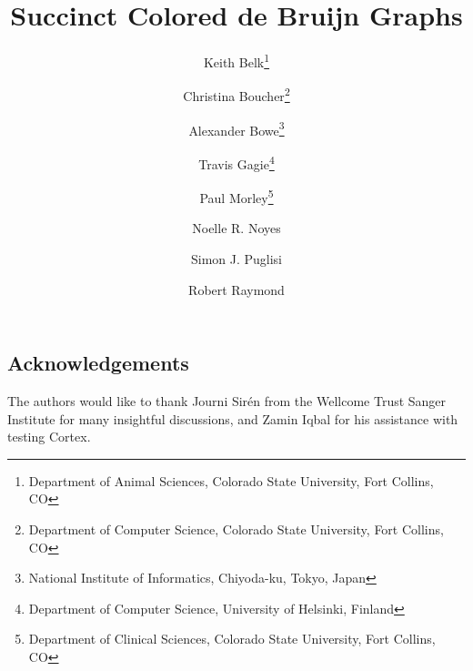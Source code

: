 \documentclass[11pt,letterpaper]{article}
\begin{document}
\title{Succinct Colored de Bruijn Graphs}
\author{Keith Belk\thanks{Department of Animal Sciences, Colorado State University, Fort Collins, CO}
\and Christina Boucher\thanks{Department of Computer Science, Colorado State University, Fort Collins, CO}
\and Alexander Bowe\thanks{National Institute of Informatics, Chiyoda-ku, Tokyo, Japan}
\and Travis Gagie\thanks{Department of Computer Science, University of Helsinki, Finland} 
\and Paul Morley\thanks{Department of Clinical Sciences, Colorado State University, Fort Collins, CO}
\and Noelle R. Noyes\footnotemark[5]
\and Simon J. Puglisi\footnotemark[4]
\and Robert Raymond\footnotemark[2]}%
\date{}
\maketitle



%




\subsection*{Acknowledgements}
The authors would like to thank Journi Sir\'{e}n from the Wellcome Trust Sanger Institute for many insightful discussions, and Zamin Iqbal for his assistance with testing {\sc Cortex}.  



\newpage 

\end{document}
